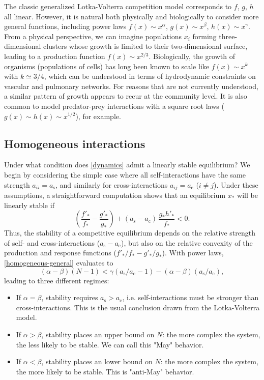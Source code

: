 \documentclass[%
 reprint,
 amsmath,amssymb,
 aps,
]{revtex4-2}
\begin{document}
The classic generalized Lotka-Volterra competition model corresponds to $f$, $g$, $h$ all linear. However, it is natural both physically and biologically to consider more general functions, including power laws $f(x)\sim x^\alpha$, $g(x)\sim x^\beta$, $h(x) \sim x^\gamma$. From a physical perspective, we can imagine populations $x_i$ forming three-dimensional clusters whose growth is limited to their two-dimensional surface, leading to a production function $f(x) \sim x^{2/3}$. Biologically, the growth of organisms (populations of cells) has long been known to scale like $f(x) \sim x^k$ with $k\simeq 3/4$, which can be understood in terms of hydrodynamic constraints on vascular and pulmonary networks. For reasons that are not currently understood, a similar pattern of growth appears to recur at the community level. It is also common to model predator-prey interactions with a square root laws ($g(x) \sim h(x) \sim x^{1/2}$), for example. 

\subsection{Homogeneous interactions}

Under what condition does \eqref{dynamics} admit a linearly stable equilibrium? We begin by considering the simple case where all self-interactions have the same strength $a_{ii} = a_{\textrm{s}}$, and similarly for cross-interactions $a_{ij} = a_{\textrm{c}}$ ($i\neq j$). Under these assumptions, a straightforward computation shows that an equilibrium $x_*$ will be linearly stable if  
\begin{equation}\label{homogeneous-general}
    \left(\frac{f'_*}{f_*} - \frac{g'_*}{g_*}\right) + (a_{\textrm{s}} - a_{\textrm{c}})\,\frac{g_*h'_*}{f_*} < 0. 
\end{equation}
Thus, the stability of a competitive equilibrium depends on the relative strength of self- and cross-interactions ($a_{\textrm{s}} - a_{\textrm{c}}$), but also on the relative convexity of the production and response functions ($f'_*/f_* - g'_*/g_*$). With power laws, \eqref{homogeneous-general} evaluates to 
\begin{equation}
    (\alpha - \beta)(N-1) < \gamma(a_{\textrm{s}}/a_{\textrm{c}}- 1) - (\alpha - \beta)(a_{\textrm{s}}/a_{\textrm{c}}),
\end{equation}
leading to three different regimes:
\begin{itemize}
    \item If $\alpha = \beta$, stability requires $a_{\textrm{s}} > a_{\textrm{c}}$, i.e. self-interactions must be stronger than cross-interactions. This is the usual conclusion drawn from the Lotka-Volterra model. 
    \item If $\alpha > \beta$, stability places an upper bound on $N$: the more complex the system, the less likely to be stable. We can call this "May" behavior.
    \item If $\alpha < \beta$, stability places an lower bound on $N$: the more complex the system, the more likely to be stable. This is "anti-May" behavior.
\end{itemize}
\end{document}
